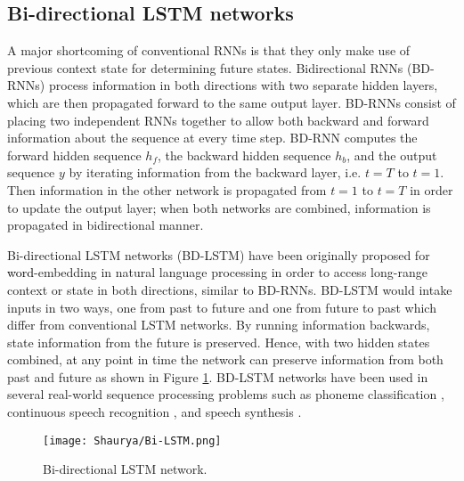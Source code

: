 \documentclass{ieeeaccess}
\begin{document}
 
 
  \subsection{Bi-directional LSTM networks }
  
 
A major shortcoming of conventional RNNs is that they 
only  make use of previous context state for determining future states. Bidirectional
RNNs (BD-RNNs) \cite{schuster1997bidirectional}  process information in both
directions with two separate hidden layers, which are then
propagated forward to the same output layer. BD-RNNs  consist of  placing two independent RNNs together to allow  both backward and forward information about the sequence at every time step. BD-RNN computes the forward hidden sequence $h_{f}$, the backward hidden sequence $h_{b}$, and the output sequence $y$ by iterating information from the backward layer, i.e. $t = T$ to $t = 1$. Then information in the other network is propagated  from $t =1$ to $t = T$  in order to update the output layer; when  both networks are combined, information is propagated in bidirectional manner.


Bi-directional LSTM networks (BD-LSTM)  \cite{graves2005framewise} have been originally proposed for \textcolor{black}{word}-embedding in natural language processing in order to access long-range context or state in both  directions, similar to BD-RNNs.  
BD-LSTM would intake inputs in two ways, one from past to future and one from future to past which differ from conventional LSTM networks.  By running information backwards, state information from the future is preserved. Hence, with two hidden states combined, \textcolor{black}{at} any point in time the network can preserve information from both past and future as shown in Figure \ref{fig:BDLSTM}.
BD-LSTM networks have been used in several real-world sequence processing problems such as phoneme classification
\cite{graves2005framewise}, continuous speech recognition \cite{Fan2014TTSSW}, and speech synthesis \cite{graves2013hybrid}.
 
 
 
 \begin{figure}[htbp!]
  \begin{center}  
   \texttt{[image: Shaurya/Bi-LSTM.png]} \\
    \caption{ Bi-directional LSTM network.}
\label{fig:BDLSTM}
  \end{center}
\end{figure}
 
\end{document}

